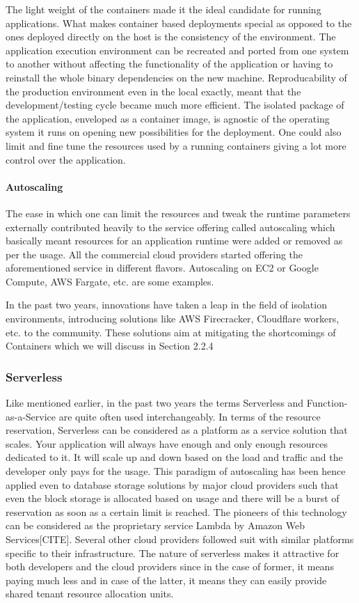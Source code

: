 \documentclass[12pt,titlepage]{article}
\begin{document}
The light weight of the containers
made it the ideal candidate for running applications. What makes container based deployments special
as opposed to the ones deployed directly on the host is the consistency of the environment. The application
execution environment can be recreated and ported from one system to another without affecting the functionality
of the application or having to reinstall the whole binary dependencies on the new machine. Reproducability of the
production environment even in the local exactly, meant that the development/testing cycle became much more efficient.
The isolated package of the application, enveloped as a container image, is
agnostic of the operating system it runs on opening new possibilities for the
deployment. One could also limit and fine tune the resources used by a running
containers giving a lot more control over the application.

\paragraph{Autoscaling}
\label{sec:orgc98dbdb}
The ease in which one can limit the resources and tweak the runtime parameters externally contributed heavily
to the service offering called autoscaling which basically meant resources for an
application runtime were added or removed as per the usage. All the commercial
cloud providers started offering the aforementioned service in different
flavors. Autoscaling on EC2 or Google Compute, AWS Fargate, etc. are some examples.

In the past two years, innovations have taken a leap in the field of isolation
environments, introducing solutions like AWS Firecracker, Cloudflare workers,
etc. to the community. These solutions aim at mitigating the shortcomings of
Containers which we will discuss in Section 2.2.4

\subsubsection{Serverless}
\label{sec:org7786448}
Like mentioned earlier, in the past two years the terms Serverless and Function-as-a-Service are quite
often used interchangeably. In terms of the resource reservation, Serverless can
be considered as a platform as a service solution that scales. Your application
will always have enough and only enough resources dedicated to it. It will scale
up and down based on the load and traffic and the developer only pays for the usage.
This paradigm of autoscaling has been hence applied even to database storage
solutions by major cloud providers such that even the block storage is allocated
based on usage and there will be a burst of reservation as soon as a certain
limit is reached.
The pioneers of this technology can be considered as the proprietary service
Lambda by Amazon Web Services[CITE]. Several other cloud providers followed suit
with similar platforms specific to their infrastructure.
The nature of serverless makes it attractive for both developers and the cloud
providers since in the case of former, it means paying much less and in case of
the latter, it means they can easily provide shared tenant resource allocation
units.
\end{document}
